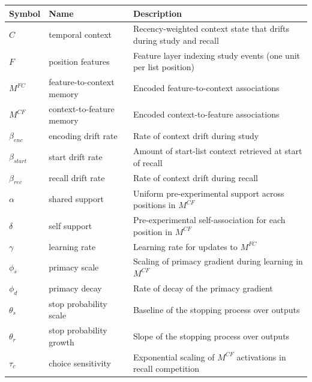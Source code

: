 \documentclass[
  man,
  floatsintext,
  longtable,
  nolmodern,
  notxfonts,
  notimes,
  draftfirst,
  colorlinks=true,linkcolor=blue,citecolor=blue,urlcolor=blue]{apa7}
\begin{document}
\begin{table}

{\caption{{Parameters and structures specifying
Instance-CMR.}{\label{tbl-cmr-parameters}}}
\vspace{-20pt}}

\begin{longtable}[]{@{}
  >{\raggedright\arraybackslash}p{}
  >{\raggedright\arraybackslash}p{}
  >{\raggedright\arraybackslash}p{}@{}}
\toprule\noalign{}
\begin{minipage}[b]{\linewidth}\raggedright
Symbol
\end{minipage} & \begin{minipage}[b]{\linewidth}\raggedright
Name
\end{minipage} & \begin{minipage}[b]{\linewidth}\raggedright
Description
\end{minipage} \\
\midrule\noalign{}
\endhead
\bottomrule\noalign{}
\endlastfoot
\(C\) & temporal context & Recency-weighted context state that drifts
during study and recall \\
\(F\) & position features & Feature layer indexing study events (one
unit per list position) \\
\(M^{FC}\) & feature-to-context memory & Encoded feature-to-context
associations \\
\(M^{CF}\) & context-to-feature memory & Encoded context-to-feature
associations \\
\({\beta}_{enc}\) & encoding drift rate & Rate of context drift during
study \\
\({\beta}_{start}\) & start drift rate & Amount of start-list context
retrieved at start of recall \\
\({\beta}_{rec}\) & recall drift rate & Rate of context drift during
recall \\
\({\alpha}\) & shared support & Uniform pre-experimental support across
positions in \(M^{CF}\) \\
\({\delta}\) & self support & Pre-experimental self-association for each
position in \(M^{CF}\) \\
\({\gamma}\) & learning rate & Learning rate for updates to
\(M^{FC}\) \\
\({\phi}_{s}\) & primacy scale & Scaling of primacy gradient during
learning in \(M^{CF}\) \\
\({\phi}_{d}\) & primacy decay & Rate of decay of the primacy
gradient \\
\({\theta}_{s}\) & stop probability scale & Baseline of the stopping
process over outputs \\
\({\theta}_{r}\) & stop probability growth & Slope of the stopping
process over outputs \\
\({\tau}_{c}\) & choice sensitivity & Exponential scaling of \(M^{CF}\)
activations in recall competition \\
\end{longtable}

\end{table}
\end{document}
